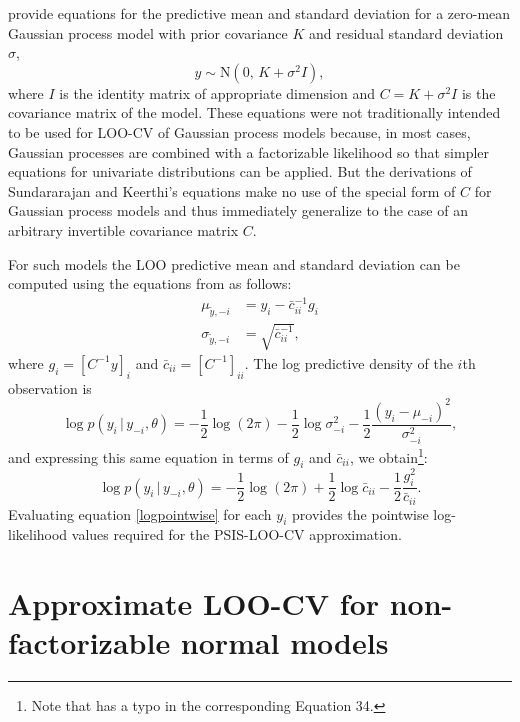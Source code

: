 \documentclass[11pt]{article}
\begin{document}
\cite{sundararajan2001} provide equations for the predictive mean and standard
deviation for a zero-mean Gaussian process model with prior covariance $K$ and
residual standard deviation $\sigma$,
%
\begin{equation}
y \sim {\mathrm N}(0, \, K+\sigma^2 I),
\end{equation}
%
where $I$ is the identity matrix of appropriate dimension and $C = K+\sigma^2 I$
is the covariance matrix of the model. These equations were not traditionally
intended to be used for LOO-CV of Gaussian process models because, in most
cases, Gaussian processes are combined with a factorizable likelihood so that
simpler equations for univariate distributions can be applied. But the
derivations of Sundararajan and Keerthi's equations make no use of the special
form of $C$ for Gaussian process models and thus immediately generalize to the
case of an arbitrary invertible covariance matrix $C$.

For such models the LOO predictive mean and standard deviation can be computed
using the equations from \cite{sundararajan2001} as follows:
%
\begin{align}
\label{ypredpars}
  \mu_{\tilde{y},-i} &= y_i-\bar{c}_{ii}^{-1} g_i \nonumber \\
  \sigma_{\tilde{y},-i} &= \sqrt{\bar{c}_{ii}^{-1}},
\end{align}
%
where $g_i = \left[C^{-1} y\right]_i$ and
$\bar{c}_{ii} = \left[C^{-1}\right]_{ii}$.
The log predictive density of the $i$th observation is
%
\begin{equation}
  \log p(y_i \,|\, y_{-i},\theta)
  = - \frac{1}{2}\log(2\pi)
  - \frac{1}{2}\log \sigma^2_{-i}
  - \frac{1}{2}\frac{(y_i-\mu_{-i})^2}{\sigma^2_{-i}},
\end{equation}
%
and expressing this same equation in terms of $g_i$ and $\bar{c}_{ii}$, we
obtain\footnote{ Note that \cite{vehtari2016} has a typo in the corresponding
Equation 34.}:
%
\begin{equation}
\label{logpointwise}
  \log p(y_i \,|\, y_{-i},\theta)
  = - \frac{1}{2}\log(2\pi)
  + \frac{1}{2}\log \bar{c}_{ii}
  - \frac{1}{2}\frac{g_i^2}{\bar{c}_{ii}}.
\end{equation}
%
Evaluating equation \eqref{logpointwise} for each $y_i$ provides the pointwise
log-likelihood values required for the PSIS-LOO-CV approximation.

\section{Approximate LOO-CV for non-factorizable normal models}
\label{sec-approx}
\end{document}
